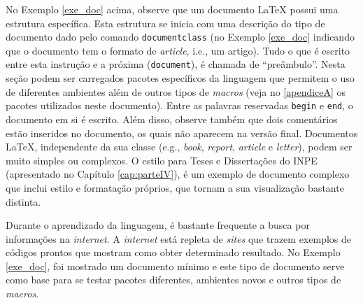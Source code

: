 
No Exemplo \ref{exe_doc} acima, observe que um documento \LaTeX{} possui uma estrutura específica. Esta estrutura se inicia com uma descrição do tipo de documento dado pelo comando \texttt{documentclass} (no Exemplo \ref{exe_doc} indicando que o documento tem o formato de \textit{article}, i.e., um artigo). Tudo o que é escrito entre esta instrução e a próxima ({\tt document}), é chamada de ``preâmbulo''. Nesta seção podem ser carregados pacotes específicos da linguagem que permitem o uso de diferentes ambientes além de outros tipos de \textit{macros} (veja no \ref{apendiceA} os pacotes utilizados neste documento). Entre as palavras reservadas \texttt{begin} e \texttt{end}, o documento em si é escrito. Além disso, observe também que dois comentários estão inseridos no documento, os quais não aparecem na versão final. Documentos \LaTeX{}, independente da sua classe (e.g., \textit{book}, \textit{report}, \textit{article} e \textit{letter}), podem ser muito simples ou complexos. O estilo para Teses e Dissertações do INPE (apresentado no Capítulo \ref{cap:parteIV}), é um exemplo de documento complexo que inclui estilo e formatação próprios, que tornam a sua visualização bastante distinta.


Durante o aprendizado da linguagem, é bastante frequente a busca por informações na \textit{internet}. A \textit{internet} está repleta de \textit{sites} que trazem exemplos de códigos prontos que mostram como obter determinado resultado. No Exemplo \ref{exe_doc}, foi mostrado um documento mínimo e este tipo de documento serve como base para se testar pacotes diferentes, ambientes novos e outros tipos de \textit{macros}.

